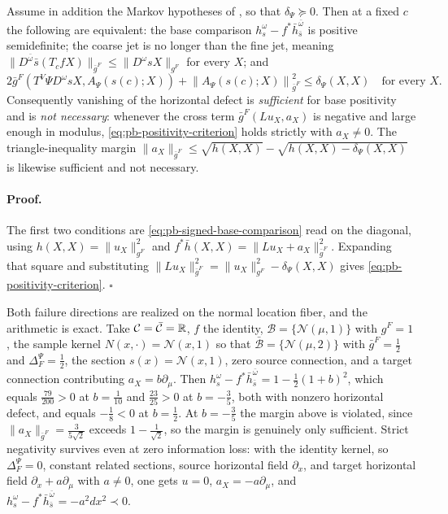 Assume in addition the Markov hypotheses of
, so that $\delta_\Psi\succeq0$.  Then at a
fixed $c$ the following are equivalent: the base comparison
$h_s^\omega-f^*\bar h_{\bar s}^{\bar\omega}$ is positive semidefinite; the
coarse jet is no longer than the fine jet, meaning
$\lVert D^{\bar\omega}\bar s(T_cfX)\rVert_{\bar g^F}
\leq\lVert D^\omega sX\rVert_{g^F}$ for every $X$; and
\begin{equation}
2\bar g^F\left(T^V\Psi D^\omega sX,A_\Psi(s(c);X)\right)
+\left\lVert A_\Psi(s(c);X)\right\rVert^2_{\bar g^F}
\leq\delta_\Psi(X,X)
\quad\text{for every }X.
\label{eq:pb-positivity-criterion}
\end{equation}
Consequently vanishing of the horizontal defect is \emph{sufficient} for base
positivity and is \emph{not necessary}: whenever the cross term
$\bar g^F(Lu_X,a_X)$ is negative and large enough in modulus,
\eqref{eq:pb-positivity-criterion} holds strictly with $a_X\ne0$.  The
triangle-inequality margin
$\lVert a_X\rVert_{\bar g^F}\leq\sqrt{h(X,X)}-\sqrt{h(X,X)-\delta_\Psi(X,X)}$
is likewise sufficient and not necessary.  

\paragraph{Proof.}
The first two conditions are \eqref{eq:pb-signed-base-comparison} read on the
diagonal, using $h(X,X)=\lVert u_X\rVert^2_{g^F}$ and
$f^*\bar h(X,X)=\lVert Lu_X+a_X\rVert^2_{\bar g^F}$.  Expanding that square and
substituting
$\lVert Lu_X\rVert^2_{\bar g^F}=\lVert u_X\rVert^2_{g^F}-\delta_\Psi(X,X)$
gives \eqref{eq:pb-positivity-criterion}.  $\square$

Both failure directions are realized on the normal location fiber, and the
arithmetic is exact.  Take $\mathcal C=\bar{\mathcal C}=\mathbb R$, $f$ the identity,
$\mathcal B=\{\mathcal N(\mu,1)\}$ with $g^F=1$, the sample kernel
$N(x,\cdot)=\mathcal N(x,1)$ so that
$\bar{\mathcal B}=\{\mathcal N(\mu,2)\}$ with $\bar g^F=\tfrac12$ and
$\Delta_F^\Psi=\tfrac12$, the section $s(x)=\mathcal N(x,1)$, zero source
connection, and a target connection contributing $a_X=b\partial_\mu$.  Then
$h_s^\omega-f^*\bar h_{\bar s}^{\bar\omega}=1-\tfrac12(1+b)^2$, which equals
$\tfrac{79}{200}>0$ at $b=\tfrac1{10}$ and $\tfrac{23}{25}>0$ at $b=-\tfrac35$,
both with nonzero horizontal defect, and equals $-\tfrac18<0$ at
$b=\tfrac12$.  At $b=-\tfrac35$ the margin above is violated, since
$\lVert a_X\rVert_{\bar g^F}=\tfrac{3}{5\sqrt2}$ exceeds
$1-\tfrac1{\sqrt2}$, so the margin is genuinely only sufficient.  Strict
negativity survives even at zero information loss: with the identity kernel, so
$\Delta_F^\Psi=0$, constant related sections, source horizontal field
$\partial_x$, and target horizontal field $\partial_x+a\partial_\mu$ with
$a\ne0$, one gets $u=0$, $a_X=-a\partial_\mu$, and
$h_s^\omega-f^*\bar h_{\bar s}^{\bar\omega}=-a^2dx^2\prec0$.

